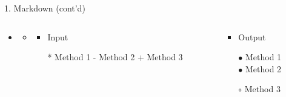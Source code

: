 \documentclass[14pt, aspectratio=169, sectionpage=simple, xclolor=table]{beamer}
\begin{document}
\begin{frame}[fragile, t]{1. Markdown (cont'd)}
\begin{itemize}
\item {}
\begin{itemize}
\item[] 


\begin{columns}
	\begin{column}{0.45\textwidth}
		\vspace{1cm}
		\begin{itemize}
			\item Input
			
			\begin{code11}
				* Method 1
				- Method 2
				    + Method 3
			\end{code11}
		\end{itemize}
	\end{column}%
	\hfill
	\begin{column}{0.45\textwidth}
		\vspace{1cm}
		\begin{itemize}
			\item Output
			
			$\bullet$ Method 1
			\\
			$\bullet$ Method 2
			
			\hspace{0.6cm} $\circ$  Method 3
			
			
		\end{itemize}
	\end{column}%
\end{columns}%
\end{itemize}
\end{itemize}


\end{frame}
\end{document}

